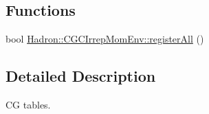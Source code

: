 \subsection*{Functions}
\begin{DoxyCompactItemize}
\item 
bool \mbox{\hyperlink{namespaceHadron_1_1CGCIrrepMomEnv_af8421782c41f7dee9d5b4a17fc748862}{Hadron\+::\+C\+G\+C\+Irrep\+Mom\+Env\+::register\+All}} ()
\end{DoxyCompactItemize}


\subsection{Detailed Description}
CG tables. 

